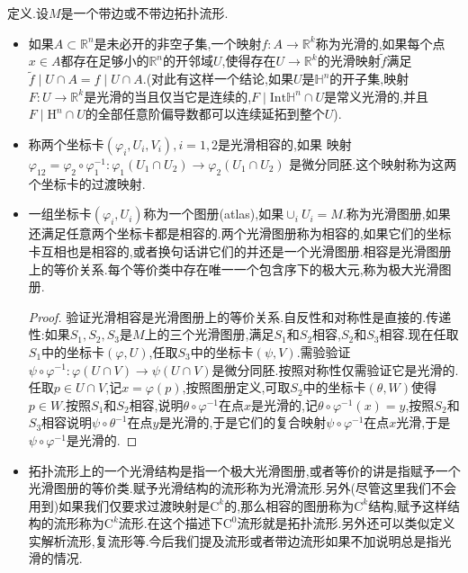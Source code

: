 定义.设$M$是一个带边或不带边拓扑流形.
\begin{itemize}
	\item 如果$A\subset\mathbb{R}^n$是未必开的非空子集,一个映射$f:A\to\mathbb{R}^k$称为光滑的,如果每个点$x\in A$都存在足够小的$\mathbb{R}^n$的开邻域$U$,使得存在$U\to\mathbb{R}^k$的光滑映射$\widetilde{f}$满足$\widetilde{f}\mid U\cap A=f\mid U\cap A$.(对此有这样一个结论,如果$U$是$\mathbb{H}^n$的开子集,映射$F:U\to\mathbb{R}^k$是光滑的当且仅当它是连续的,$F\mid\mathrm{Int}\mathbb{H}^n\cap U$是常义光滑的,并且$F\mid\mathrm{H}^n\cap U$的全部任意阶偏导数都可以连续延拓到整个$U$).
	\item 称两个坐标卡$(\varphi_i,U_i,V_i),i=1,2$是光滑相容的,如果
	映射$\varphi_{12}=\varphi_2\circ\varphi_1^{-1}:\varphi_1(U_1\cap U_2)\to\varphi_2(U_1\cap U_2)$
	是微分同胚.这个映射称为这两个坐标卡的过渡映射.
	\item 一组坐标卡$(\varphi_i,U_i)$称为一个图册(atlas),如果$\cup_iU_i=M$.称为光滑图册,如果还满足任意两个坐标卡都是相容的.两个光滑图册称为相容的,如果它们的坐标卡互相也是相容的,或者换句话讲它们的并还是一个光滑图册.相容是光滑图册上的等价关系.每个等价类中存在唯一一个包含序下的极大元,称为极大光滑图册.
	\begin{proof}
		
		验证光滑相容是光滑图册上的等价关系.自反性和对称性是直接的.传递性:如果$S_1,S_2,S_3$是$M$上的三个光滑图册,满足$S_1$和$S_2$相容,$S_2$和$S_3$相容.现在任取$S_1$中的坐标卡$(\varphi,U)$,任取$S_3$中的坐标卡$(\psi,V)$.需验验证$\psi\circ\varphi^{-1}:\varphi(U\cap V)\to\psi(U\cap V)$是微分同胚.按照对称性仅需验证它是光滑的.任取$p\in U\cap V$,记$x=\varphi(p)$,按照图册定义,可取$S_2$中的坐标卡$(\theta,W)$使得$p\in W$.按照$S_1$和$S_2$相容,说明$\theta\circ\varphi^{-1}$在点$x$是光滑的,记$\theta\circ\varphi^{-1}(x)=y$,按照$S_2$和$S_3$相容说明$\psi\circ\theta^{-1}$在点$y$是光滑的,于是它们的复合映射$\psi\circ\varphi^{-1}$在点$x$光滑,于是$\psi\circ\varphi^{-1}$是光滑的.
	\end{proof}
	\item 拓扑流形上的一个光滑结构是指一个极大光滑图册,或者等价的讲是指赋予一个光滑图册的等价类.赋予光滑结构的流形称为光滑流形.另外(尽管这里我们不会用到)如果我们仅要求过渡映射是$\mathrm{C}^k$的,那么相容的图册称为$\mathrm{C}^k$结构,赋予这样结构的流形称为$\mathrm{C}^k$流形.在这个描述下$\mathrm{C}^0$流形就是拓扑流形.另外还可以类似定义实解析流形,复流形等.今后我们提及流形或者带边流形如果不加说明总是指光滑的情况.
\end{itemize}

